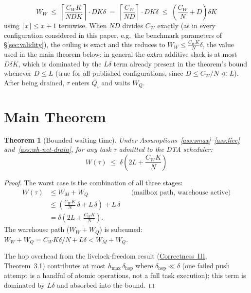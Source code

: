 \documentclass[11pt,a4paper]{report}
\newtheorem{theorem}{Theorem}[section]
\newcommand{\ceil}[1]{\left\lceil #1 \right\rceil}
\begin{document}
\[
  W_W \;\leq\; \ceil{\frac{C_W K}{NDK}} \cdot DK\delta
       \;=\; \ceil{\frac{C_W}{ND}} \cdot DK\delta
       \;\leq\; \left(\frac{C_W}{N} + D\right)\delta K
\]
using $\lceil x \rceil \le x+1$ termwise. When $ND$ divides $C_W$
exactly (as in every configuration considered in this paper, e.g.\ the
benchmark parameters of \S\ref{sec:validity}), the ceiling is exact and
this reduces to $W_W \leq \frac{C_WK}{N}\delta$, the value used in the
main theorem below; in general the extra additive slack is at most
$D\delta K$, which is dominated by the $L\delta$ term already present
in the theorem's bound whenever $D \leq L$ (true for all published
configurations, since $D \le C_W/N \ll L$).
After being drained, $\tau$ enters $Q_i$ and waits $W_Q$.

\section{Main Theorem}

\begin{theorem}[Bounded waiting time]
\label{thm:bounded-wait}
Under Assumptions~\ref{ass:smax}--\ref{ass:live} and~\ref{ass:wh-net-drain},
for any task $\tau$ admitted to the DTA scheduler:
\[
  \boxed{
    W(\tau) \;\leq\; \delta\!\left(2L + \frac{C_W K}{N}\right)
  }
\]
\end{theorem}

\begin{proof}
The worst case is the combination of all three stages:
\begin{align*}
  W(\tau)
  &\leq W_M + W_Q
  &&\text{(mailbox path, warehouse active)} \\
  &\leq \left(\frac{C_W K}{N}\,\delta + L\,\delta\right) + L\,\delta \\
  &= \delta\!\left(2L + \frac{C_W K}{N}\right).
\end{align*}
The warehouse path ($W_W + W_Q$) is subsumed:
$W_W + W_Q = C_W K\delta/N + L\delta < W_M + W_Q$.

The hop overhead from the livelock-freedom result
(\hyperref[chap:livelock]{Correctness~III}, Theorem~3.1)
contributes at most $h_{\max}\,\delta_{\mathrm{hop}}$ where
$\delta_{\mathrm{hop}} \ll \delta$ (one failed push attempt is a
handful of atomic operations, not a full task execution); this term
is dominated by $L\delta$ and absorbed into the bound.
\end{proof}
\end{document}
